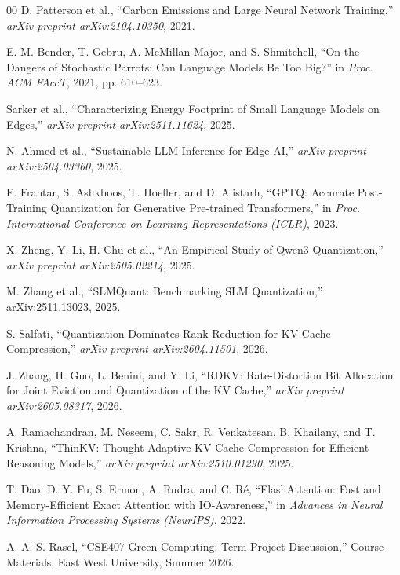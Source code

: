 \documentclass[conference]{IEEEtran}
\begin{document}
\begin{thebibliography}{00}
D. Patterson et al., ``Carbon Emissions and Large Neural Network Training,'' \textit{arXiv preprint arXiv:2104.10350}, 2021.

E. M. Bender, T. Gebru, A. McMillan-Major, and S. Shmitchell, ``On the Dangers of Stochastic Parrots: Can Language Models Be Too Big?'' in \textit{Proc. ACM FAccT}, 2021, pp. 610--623.

Sarker et al., ``Characterizing Energy Footprint of Small Language Models on Edges,'' \textit{arXiv preprint arXiv:2511.11624}, 2025.

N. Ahmed et al., ``Sustainable LLM Inference for Edge AI,'' \textit{arXiv preprint arXiv:2504.03360}, 2025.

E. Frantar, S. Ashkboos, T. Hoefler, and D. Alistarh, ``GPTQ: Accurate Post-Training Quantization for Generative Pre-trained Transformers,'' in \textit{Proc. International Conference on Learning Representations (ICLR)}, 2023.

X. Zheng, Y. Li, H. Chu et al., ``An Empirical Study of Qwen3 Quantization,'' \textit{arXiv preprint arXiv:2505.02214}, 2025.

M. Zhang et al., ``SLMQuant: Benchmarking SLM Quantization,'' arXiv:2511.13023, 2025.

S. Salfati, ``Quantization Dominates Rank Reduction for KV-Cache Compression,'' \textit{arXiv preprint arXiv:2604.11501}, 2026.

J. Zhang, H. Guo, L. Benini, and Y. Li, ``RDKV: Rate-Distortion Bit Allocation for Joint Eviction and Quantization of the KV Cache,'' \textit{arXiv preprint arXiv:2605.08317}, 2026.

A. Ramachandran, M. Neseem, C. Sakr, R. Venkatesan, B. Khailany, and T. Krishna, ``ThinKV: Thought-Adaptive KV Cache Compression for Efficient Reasoning Models,'' \textit{arXiv preprint arXiv:2510.01290}, 2025.

T. Dao, D. Y. Fu, S. Ermon, A. Rudra, and C. R\'{e}, ``FlashAttention: Fast and Memory-Efficient Exact Attention with IO-Awareness,'' in \textit{Advances in Neural Information Processing Systems (NeurIPS)}, 2022.

A. A. S. Rasel, ``CSE407 Green Computing: Term Project Discussion,'' Course Materials, East West University, Summer 2026.

\end{thebibliography}
\end{document}
